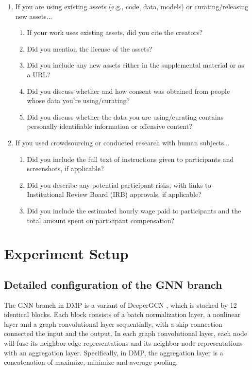 \documentclass{article}
\newcommand{\ourM}{DMP}
\begin{document}
\begin{enumerate}
\item If you are using existing assets (e.g., code, data, models) or curating/releasing new assets...
\begin{enumerate}
  \item If your work uses existing assets, did you cite the creators?
    \answerYes{}
  \item Did you mention the license of the assets?
    \answerNA{}
  \item Did you include any new assets either in the supplemental material or as a URL?
    \answerYes{}
  \item Did you discuss whether and how consent was obtained from people whose data you're using/curating?
    \answerNA{}
  \item Did you discuss whether the data you are using/curating contains personally identifiable information or offensive content?
    \answerNA{}
\end{enumerate}

\item If you used crowdsourcing or conducted research with human subjects...
\begin{enumerate}
  \item Did you include the full text of instructions given to participants and screenshots, if applicable?
    \answerNA{}
  \item Did you describe any potential participant risks, with links to Institutional Review Board (IRB) approvals, if applicable?
    \answerNA{}
  \item Did you include the estimated hourly wage paid to participants and the total amount spent on participant compensation?
    \answerNA{}
\end{enumerate}

\end{enumerate}
\fi


\appendix
\section{Experiment Setup}
\subsection{Detailed configuration of the GNN branch}\label{appendix:deepergcn}
The GNN branch in \ourM{} is a variant of DeeperGCN \citep{li2020deepergcn}, which is stacked by 12 identical blocks. Each block consists of a batch normalization layer, a nonlinear layer and a graph convolutional layer sequentially, with a skip  connection connected the input and the output. In each graph convolutional layer, each node will fuse its neighbor edge representations and its neighbor node representations with an aggregation layer. Specifically, in \ourM{}, the aggregation layer is a concatenation of maximize, minimize and average pooling. 
\end{document}
